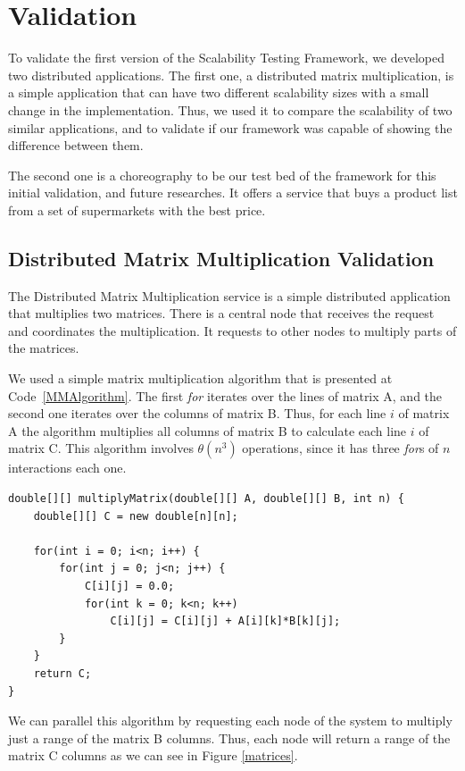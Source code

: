 \section{Validation}
To validate the first version of the Scalability Testing Framework, we developed two distributed applications. The first one, a distributed matrix multiplication, is a simple application that can have two different scalability sizes with a small change in the implementation. Thus, we used it to compare the scalability of two similar applications, and to validate if our framework was capable of showing the difference between them.

The second one is a choreography to be our test bed of the framework for this initial validation, and future researches. It offers a service that buys a product list from a set of supermarkets with the best price.

\subsection{Distributed Matrix Multiplication Validation}

The Distributed Matrix Multiplication service is a simple distributed application that multiplies two matrices. There is a central node that receives the request and coordinates the multiplication. It requests to other nodes to multiply parts of the matrices.

We used a simple matrix multiplication algorithm that is presented at Code~\ref{MMAlgorithm}. The first \emph{for} iterates over the lines of matrix A, and the second one iterates over the columns of matrix B. Thus, for each line $i$ of matrix A the algorithm multiplies all columns of matrix B to calculate each line $i$ of matrix C. This algorithm involves $\theta(n^3)$ operations, since it has three \emph{for}s of $n$ interactions each one.
\begin{lstlisting}
double[][] multiplyMatrix(double[][] A, double[][] B, int n) {
	double[][] C = new double[n][n];
	
	for(int i = 0; i<n; i++) {
		for(int j = 0; j<n; j++) {
			C[i][j] = 0.0;
			for(int k = 0; k<n; k++)
				C[i][j] = C[i][j] + A[i][k]*B[k][j];
		}
	}
	return C;
}
\end{lstlisting}

We can parallel this algorithm by requesting each node of the system to multiply just a range of the matrix B columns. Thus, each node will return a range of the matrix C columns as we can see in Figure \ref{matrices}.

